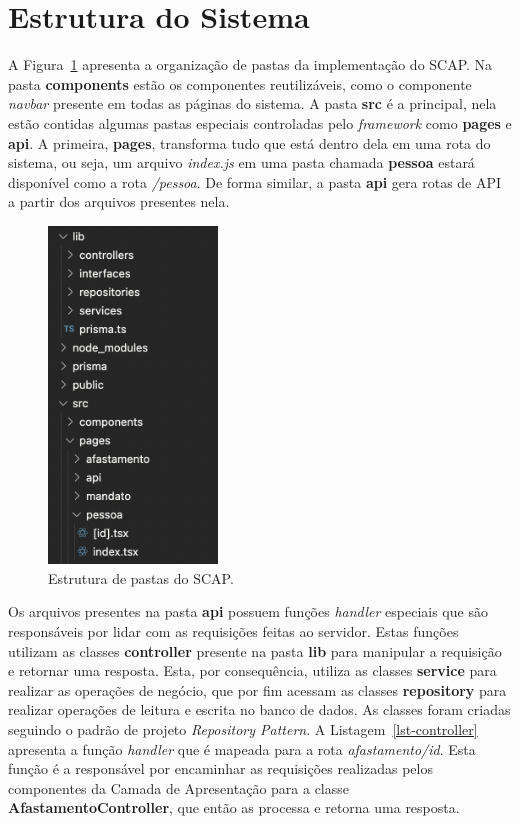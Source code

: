 \FloatBarrier


\section{Estrutura do Sistema}
\label{sec-projeto-estrutura}

A Figura~\ref{fig-pastas} apresenta a organização de pastas da implementação do SCAP. 
Na pasta \textbf{components} estão os componentes reutilizáveis, como o componente \textit{navbar} presente em todas as páginas do sistema.
A pasta \textbf{src} é a principal, nela estão contidas algumas pastas especiais controladas pelo \textit{framework}
como \textbf{pages} e \textbf{api}. A primeira, \textbf{pages}, transforma tudo que está dentro dela em uma rota do sistema,
ou seja, um arquivo \textit{index.js} em uma pasta chamada \textbf{pessoa} estará disponível como a rota \textit{/pessoa}.
De forma similar, a pasta \textbf{api} gera rotas de API a partir dos arquivos presentes nela.


\begin{figure}[h!]
	\centering
	\includegraphics[width=0.4\textwidth]{figuras/fig-pastas.png}
	\caption{Estrutura de pastas do SCAP.}
	\label{fig-pastas}
\end{figure}

Os arquivos presentes na pasta \textbf{api} possuem funções \textit{handler} especiais que são responsáveis por lidar com as requisições feitas ao servidor.
Estas funções utilizam as classes \textbf{controller} presente na pasta \textbf{lib} para manipular a requisição e retornar uma resposta.
Esta, por consequência, utiliza as classes \textbf{service} para realizar as operações de negócio, que por fim acessam as classes \textbf{repository} para realizar
operações de leitura e escrita no banco de dados. As classes foram criadas seguindo o padrão de projeto \textit{Repository Pattern}.
A Listagem~\ref{lst-controller} apresenta a função \textit{handler} que é mapeada para a rota \textit{afastamento/id}. Esta função é a
responsável por encaminhar as requisições realizadas pelos componentes da Camada de Apresentação para a classe \textbf{AfastamentoController},
que então as processa e retorna uma resposta.

